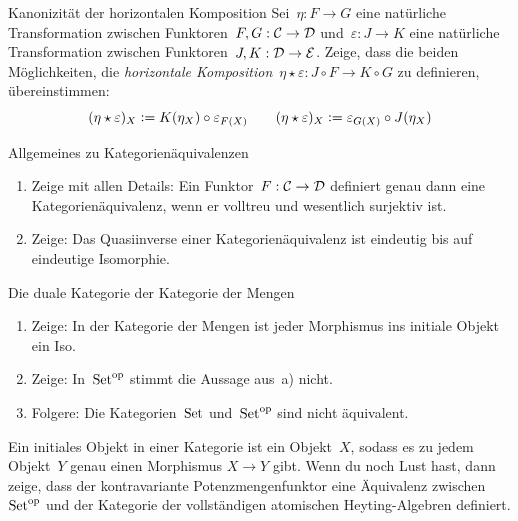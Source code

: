 \documentclass{uebblatt}
\begin{document}
\begin{aufgabe}{Kanonizität der horizontalen Komposition}
Sei~$\eta : F \to G$ eine natürliche Transformation zwischen
Funktoren~$F,G : \mathcal{C} \to \mathcal{D}$ und~$\varepsilon : J \to K$ eine natürliche
Transformation zwischen Funktoren~$J,K : \mathcal{D} \to \mathcal{E}$. Zeige, dass die beiden
Möglichkeiten, die \emph{horizontale Komposition}~$\eta \star \varepsilon : J
\circ F \to K \circ G$ zu definieren, übereinstimmen:
\[ (\eta \star \varepsilon)_X \vcentcolon= K(\eta_X) \circ \varepsilon_{F(X)}
  \qquad
  (\eta \star \varepsilon)_X \vcentcolon= \varepsilon_{G(X)} \circ J(\eta_X)
\]
\end{aufgabe}
\vspace{-2em}

\begin{aufgabe}{Allgemeines zu Kategorienäquivalenzen}
\begin{enumerate}
\item Zeige mit allen Details: Ein Funktor~$F : \mathcal{C} \to \mathcal{D}$ definiert genau dann
eine Kategorienäquivalenz, wenn er volltreu und wesentlich surjektiv ist.
\item Zeige: Das Quasiinverse einer Kategorienäquivalenz ist eindeutig bis auf
eindeutige Isomorphie.
\end{enumerate}
\end{aufgabe}

\begin{aufgabe}{Die duale Kategorie der Kategorie der Mengen}
\begin{enumerate}
\item Zeige: In der Kategorie der Mengen ist jeder Morphismus ins initiale
Objekt ein Iso.
\item Zeige: In~$\mathrm{Set}^{\mathrm{op}}$ stimmt die Aussage aus~a) nicht.
\item Folgere: Die Kategorien~$\mathrm{Set}$ und~$\mathrm{Set}^{\mathrm{op}}$ sind nicht äquivalent.
\end{enumerate}
\begin{minipage}{0.87\textwidth}
\tiny Ein initiales Objekt in einer Kategorie ist ein Objekt~$X$, sodass es zu
jedem Objekt~$Y$ genau einen Morphismus $X \to Y$ gibt.
Wenn du noch Lust hast, dann zeige, dass der kontravariante
Potenzmengenfunktor eine Äquivalenz zwischen~$\mathrm{Set}^{\mathrm{op}}$ und der Kategorie der
vollständigen atomischen Heyting-Algebren definiert.\par
\end{minipage}
\end{aufgabe}
\end{document}
